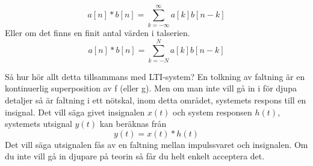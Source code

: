 \documentclass{article}
\begin{document}
$$a[n] * b[n] = \sum_{k=-\infty}^{\infty} a[k] b[n-k]$$
Eller om det finns en finit antal värden i talserien. %
$$a[n] * b[n] = \sum_{k=-N}^{N} a[k] b[n-k]$$



Så hur hör allt detta tillsammans med LTI-system? En tolkning av faltning
är en kontinuerlig superposition av f (eller g). Men om man inte vill gå in
i för djupa detaljer så är faltning i ett nötskal, inom detta området,
systemets respons till en insignal. Det vill säga givet insignalen $x(t)$
och system responsen $h(t)$, systemets utsignal $y(t)$ kan beräknas från
$$y(t) = x(t) * h(t) $$
Det vill säga utsignalen fås av en faltning mellan impulssvaret och insignalen. Om du inte vill gå in djupare på teorin så får du helt enkelt acceptera det.
\\
\end{document}
